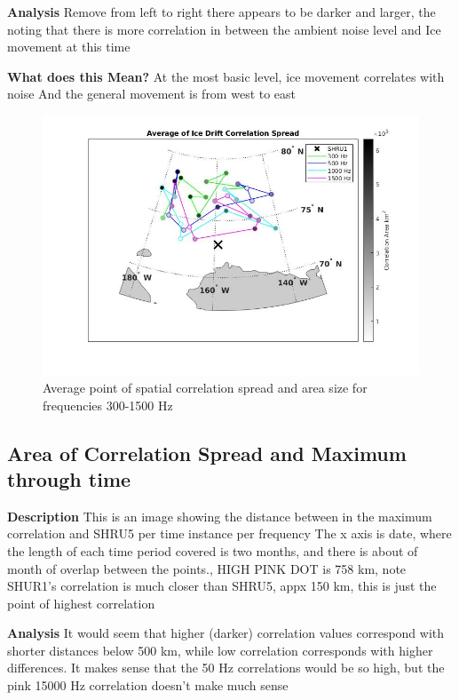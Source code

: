 \textbf{Analysis}
Remove from left to right there appears to be darker and larger, the noting that there is more correlation in between the ambient noise level and Ice movement at this time

\textbf{What does this Mean?}
At the most basic level, ice movement correlates with noise
And the general movement is from west to east


\begin{figure}[h]
\centering
\includegraphics[scale=0.5]{Figures/avg_map_grayscale.jpg}
\caption{Average point of spatial correlation spread and area size for frequencies 300-1500 Hz}
\label{fig_maxcorr_location}
\end{figure}

\subsection{Area of Correlation Spread and Maximum  through time}
\textbf{Description}
This is an image showing the distance between in the maximum correlation and SHRU5 per time instance per frequency
The x axis is date, where the length of each time period covered is two months, and there is about of month of overlap between the points.,
HIGH PINK DOT is 758 km, note SHUR1’s correlation is much closer than SHRU5, appx 150 km, this is just the point of highest correlation

\textbf{Analysis}
It would seem that higher (darker) correlation values correspond with shorter distances below 500 km, while low correlation corresponds with higher differences.
It makes sense that the 50 Hz correlations would be so high, but the pink 15000 Hz correlation doesn’t make much sense

